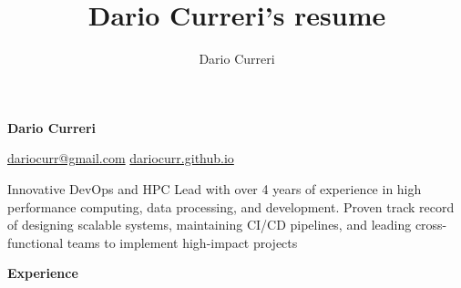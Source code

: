 \documentclass[11pt,letterpaper]{article}
\author{Dario Curreri}
\title{Dario Curreri's resume}
\begin{document}
\makeatletter
\def\Hy@colorlink#1{\begingroup\fontshape{it}\selectfont}%
\makeatother
\begin{justify}
      \begin{LARGE}
            \textbf{Dario Curreri}
      \end{LARGE}
      \hspace{0.5cm}
      \href{mailto:dariocurr@gmail.com}{dariocurr@gmail.com}
      \hspace{0.5cm}
      \href{https://dariocurr.github.io/}{dariocurr.github.io}
      \hfill
      \href{https://github.com/dariocurr/}{\Large{\faGithub}}
      \hspace{0.3cm}
      \href{https://www.linkedin.com/in/dariocurr}{\Large{\faLinkedinIn}}
      \hspace{0.3cm}
      \href{https://scholar.google.it/citations?user=DhJKkeMAAAAJ}{\Large{\faGraduationCap}}

      Innovative DevOps and HPC Lead with over 4 years of experience in high performance computing, data processing, and development.
      Proven track record of designing scalable systems, maintaining CI/CD pipelines, and leading cross-functional teams to implement high-impact projects

            {\Large \textbf{Experience} \strut}


\end{justify}
\end{document}
